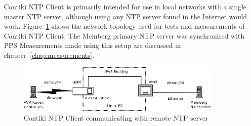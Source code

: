 Contiki NTP Client is primarily intended for use in local networks with a single master NTP server,
although using any NTP server found in the Internet would work.
Figure~\ref{fig:implementation-routing} shows the network topology used
for tests and measurements of Contiki NTP Client.
The Meinberg primary NTP server was synchronised with PPS %
Measurements made using this setup are discussed in chapter~\ref{chap:measurements}.

\begin{figure}
	\centering
	\includegraphics[width=10cm,keepaspectratio]{fig/radvd-routing.png}
	\caption{Contiki NTP Client communicating with remote NTP server}
	\label{fig:implementation-routing}
\end{figure}
